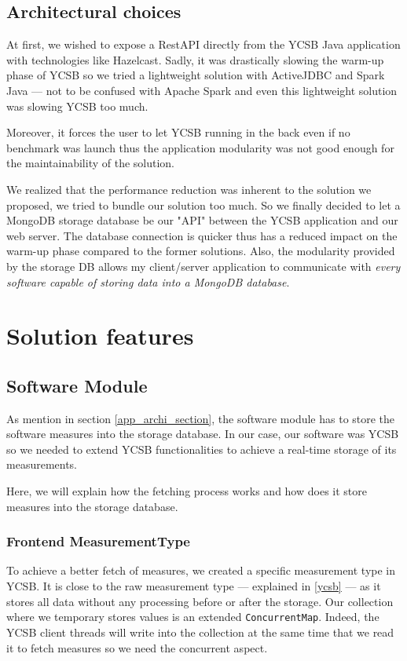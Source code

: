 \documentclass[a4paper,11pt]{report}
\begin{document}
\subsection{Architectural choices}

At first, we wished to expose a RestAPI directly from the YCSB Java application with technologies like Hazelcast. Sadly, it was drastically slowing the warm-up phase of YCSB so we tried a lightweight solution with ActiveJDBC and Spark Java --- not to be confused with Apache Spark and even this lightweight solution was slowing YCSB too much. 

Moreover, it forces the user to let YCSB running in the back even if no benchmark was launch thus the application modularity was not good enough for the maintainability of the solution. 

We realized that the performance reduction was inherent to the solution we proposed, we tried to bundle our solution too much. So we finally decided to let a MongoDB storage database be our "API" between the YCSB application and our web server. The database connection is quicker thus has a reduced impact on the warm-up phase compared to the former solutions. Also, the modularity provided by the storage DB allows my client/server application to communicate with \textit{every software capable of storing data into a MongoDB database}.

\section{Solution features}\label{technical_description}

\subsection{Software Module}

As mention in section \ref{app_archi_section}, the software module has to store the software measures into the storage database. In our case, our software was YCSB so we needed to extend YCSB functionalities to achieve a real-time storage of its measurements. 

Here, we will explain how the fetching process works and how does it store measures into the storage database.

\subsubsection{Frontend MeasurementType} To achieve a better fetch of measures, we created a specific measurement type in YCSB. It is close to the raw measurement type --- explained in \ref{ycsb} --- as it stores all data without any processing before or after the storage. Our collection where we temporary stores values is an extended \texttt{ConcurrentMap}. Indeed, the YCSB client threads will write into the collection at the same time that we read it to fetch measures so we need the concurrent aspect.
\end{document}
